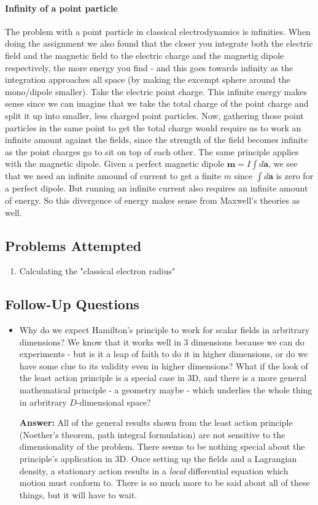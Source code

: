 \paragraph{Infinity of a point particle} 
The problem with a point particle in classical electrodynamics is infinities. When doing the assignment we also found that the closer you integrate both the electric field and the magnetic field to the electric charge and the magnetig dipole respectively, the more energy you find - and this goes towards infinity as the integration approaches all space (by making the excempt sphere around the mono/dipole smaller). Take the electric point charge. This infinite energy makes sense since we can imagine that we take the total charge of the point charge and split it up into smaller, less charged point particles. Now, gathering those point particles in the same point to get the total charge would require us to work an infinite amount against the fields, since the strength of the field becomes infinite as the point charges go to sit on top of each other. The same principle applies with the magnetic dipole. Given a perfect magnetic dipole \(\mathbf{m} = I \int d \mathbf{a}\), we see that we need an infinite amound of current to get a finite \(m\) since \(\int d \mathbf{a}\) is zero for a perfect dipole. But running an infinite current also requires an infinite amount of energy. So this divergence of energy makes sense from Maxwell's theories as well. 

\subsection*{Problems Attempted}
\begin{enumerate}
    \item Calculating the "classical electron radius"
\end{enumerate}

\subsection*{Follow-Up Questions}
\begin{itemize}
    \item Why do we expect Hamilton's principle to work for scalar fields in arbritrary dimensions? We know that it works well in 3 dimensions because we can do experiments - but is it a leap of faith to do it in higher dimensions, or do we have some clue to its validity even in higher dimensions? What if the look of the least action principle is a special case in 3D, and there is a more general mathematical principle - a geometry maybe - which underlies the whole thing in arbritrary \(D\)-dimensional space?
    
    \textbf{Answer:} All of the general results shown from the least action principle (Noether's theorem, path integral formulation) are not sensitive to the dimensionality of the problem. There seems to be nothing special about the principle's application in 3D. Once setting up the fields and a Lagrangian density, a stationary action results in a \textit{local} differential equation which motion must conform to. There is so much more to be said about all of these things, but it will have to wait.
\end{itemize}
